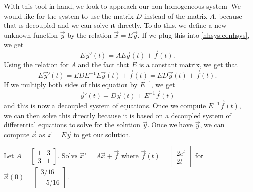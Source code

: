 With this tool in hand, we look to approach our non-homogeneous system. We would like for the system to use the matrix $D$ instead of the matrix $A$, because that is decoupled and we can solve it directly. To do this, we define a new unknown function $\vec{y}$ by the relation $\vec{x} = E\vec{y}$. If we plug this into \eqref{nhsys:ednhsys}, we get
\begin{equation*}
{E\vec{y}}' (t) = A E\vec{y}(t) + \vec{f}(t).
\end{equation*} 
Using the relation for $A$ and the fact that $E$ is a constant matrix, we get that
\begin{equation*}
E{\vec{y}}' (t) = EDE^{-1} E \vec{y}(t) + \vec{f}(t) = ED\vec{y}(t) + \vec{f}(t).
\end{equation*}
If we multiply both sides of this equation by $E^{-1}$, we get
\begin{equation*}
{\vec{y}}' (t) = D\vec{y}(t) + E^{-1}\vec{f}(t)
\end{equation*}
and this is now a decoupled system of equations. Once we compute $E^{-1}\vec{f}(t)$, we can then solve this directly because it is based on a decoupled system of differential equations to solve for the solution $\vec{y}$. Once we have $\vec{y}$, we can compute $\vec{x}$ as $\vec{x} = E\vec{y}$ to get our solution. 

\begin{example}
Let $A = \left[
\begin{smallmatrix}
1 & 3 \\
3 & 1
\end{smallmatrix} \right]$.
Solve ${\vec{x}}' = A \vec{x} +
\vec{f}$ where $\vec{f}(t) = 
\left[ \begin{smallmatrix}
2e^t \\
2t
\end{smallmatrix} \right]$ for $\vec{x}(0) =
\left[ \begin{smallmatrix}
3/16 \\
-5/16
\end{smallmatrix} \right]$.
\end{example}

